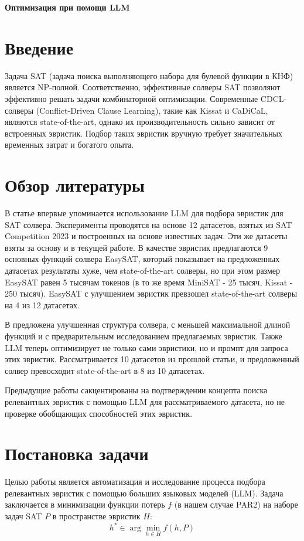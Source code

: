 \documentclass[12pt, a4paper]{article}
\begin{document}
\begin{center}
    \textbf{\Large Оптимизация при помощи LLM} \\[0.5cm]
\end{center}
    
\section*{Введение}
Задача SAT (задача поиска выполняющего набора для булевой функции в КНФ) является NP-полной. Соответственно, эффективные солверы SAT позволяют эффективно решать задачи комбинаторной оптимизации. Современные CDCL-солверы (Conflict-Driven Clause Learning), такие как Kissat и CaDiCaL, являются state-of-the-art, однако их производительность сильно зависит от встроенных эвристик. Подбор таких эвристик вручную требует значительных временных затрат и богатого опыта.

\section*{Обзор литературы}
В статье \cite{1} впервые упоминается использование LLM для подбора эвристик для SAT солвера. Эксперименты проводятся на основе 12 датасетов, взятых из SAT Competition 2023 и построенных на основе известных задач. Эти же датасеты взяты за основу и в текущей работе. В качестве эвристик предлагаются 9 основных функций солвера EasySAT, который показывает на предложенных датасетах результаты хуже, чем state-of-the-art солверы, но при этом размер EasySAT равен 5 тысячам токенов (в то же время MiniSAT - 25 тысяч, Kissat - 250 тысяч). EasySAT с улучшением эвристик превзошел state-of-the-art солверы на 4 из 12 датасетах. 

В \cite{2} предложена улучшенная структура солвера, с меньшей максимальной длиной функций и с предварительным исследованием предлагаемых эвристик. Также LLM теперь оптимизирует не только сами эвристики, но и промпт для запроса этих эвристик. Рассматривается 10 датасетов из прошлой статьи, и предложенный солвер превосходит state-of-the-art в 8 из 10 датасетах. 

Предыдущие работы сакцентированы на подтверждении концепта поиска релевантных эвристик с помощью LLM для рассматриваемого датасета, но не проверке обобщающих способностей этих эвристик.

\section*{Постановка задачи}
Целью работы является автоматизация и исследование процесса подбора релевантных эвристик с помощью больших языковых моделей (LLM). Задача заключается в минимизации функции потерь $f$ (в нашем случае PAR2) на наборе задач SAT $P$ в пространстве эвристик $H$:
$$h^{*} \in \arg\min_{h \in H} f(h, P)$$
\end{document}
